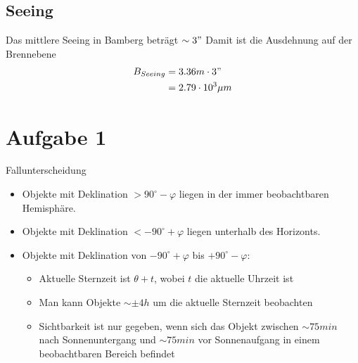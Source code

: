\documentclass[titlepage]{scrartcl}
\begin{document}
\subsection{Seeing}
Das mittlere Seeing in Bamberg beträgt $\sim3 "$ 
Damit ist die Ausdehnung auf der Brennebene
\begin{align*}
B_{Seeing}&=3.36m \cdot 3"\\
&= 2.79 \cdot 10^3 \mu m
\end{align*}
\section{Aufgabe 1}
\label{aufgabe-1}
Fallunterscheidung
\begin{itemize}
\item Objekte mit Deklination  $> 90^\circ - \varphi$ liegen in der immer beobachtbaren Hemisphäre.
\item Objekte mit Deklination $< - 90^\circ + \varphi$ liegen unterhalb des Horizonts.
\item Objekte mit Deklination von $-90^\circ + \varphi$ bis $+90^\circ - \varphi$:
\begin{itemize}
\item Aktuelle Sternzeit ist $\theta + t$, wobei $t$ die aktuelle Uhrzeit ist
\item Man kann Objekte $\sim\pm 4 h$ um die aktuelle Sternzeit beobachten
\item Sichtbarkeit ist nur gegeben, wenn sich das Objekt zwischen $\sim 75 min$ nach Sonnenuntergang und $\sim 75 min$ vor Sonnenaufgang in einem beobachtbaren Bereich befindet
\end{itemize}
\end{itemize}
\end{document}
